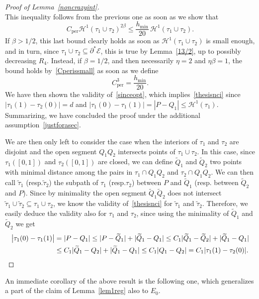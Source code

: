 \documentclass[11pt]{article}
\newcommand{\resp}{resp.\xspace}
\numberwithin{equation}{section}
\newcommand\Ceeb{C_\mathrm{per}}
\newcommand\E{\mathcal{E}}
\renewcommand\H{\mathcal{H}}
\theoremstyle{plain}
\theoremstyle{definition}
\begin{document}
\begin{proof}[Proof of Lemma~\ref{noncrazyint}]
\begin{equation}
\end{equation}
This inequality follows from the previous one as soon as we show that
\[
\Ceeb \H^1(\tau_1 \cup\tau_2)^{2\beta} \leq \frac{h_{\min}}{20}\,\H^1(\tau_1 \cup\tau_2).
\]
If $\beta>1/2$, this last bound clearly holds as soon as $\H^1(\tau_1 \cup\tau_2)$ is small enough, and in turn, since $\tau_1\cup\tau_2\subseteq\partial^*\E$, this is true by Lemma~\ref{13/2}, up to possibly decreasing $R_4$. Instead, if $\beta=1/2$, and then necessarily $\eta=2$ and $\eta\beta=1$, the bound holds by~\eqref{Cperissmall} as soon as we define
\begin{equation}\label{ceeb3}
\Ceeb^3=\frac{h_{\min}}{20}.
\end{equation}
We have then shown the validity of~\eqref{sinceopt}, which implies~\eqref{thesisnci} since $|\tau_1(1)-\tau_2(0)|=d$ and $|\tau_1(0)-\tau_1(1)|=|P-Q_1|\leq \H^1(\tau_1)$. Summarizing, we have concluded the proof under the additional assumption~\eqref{justforasec}.

We are then only left to consider the case when the interiors of $\tau_1$ and $\tau_2$ are disjoint and the open segment $Q_1Q_2$ intersects points of $\tau_1\cup\tau_2$. In this case, since $\tau_1([0,1])$ and $\tau_2([0,1])$ are closed, we can define $\widetilde Q_1$ and $\widetilde Q_2$ two points with minimal distance among the pairs in $\tau_1\cap Q_1Q_2$ and $\tau_2\cap Q_1Q_2$. We can then call $\tilde \tau_1$ (\resp $\tilde\tau_2$) the subpath of $\tau_1$ (\resp $\tau_2$) between $P$ and $\widetilde Q_1$ (\resp between $\widetilde Q_2$ and $P$). Since by minimality the open segment $\widetilde Q_1\widetilde Q_2$ does not intersect $\tilde\tau_1\cup\tilde\tau_2 \subseteq \tau_1\cup\tau_2$, we know the validity of~\eqref{thesisnci} for $\tilde\tau_1$ and $\tilde\tau_2$. Therefore, we easily deduce the validity also for $\tau_1$ and $\tau_2$, since using the minimality of $\widetilde Q_1$ and $\widetilde Q_2$ we get
\begin{align*}
\big|\tau_1(0)-\tau_1(1)\big| &= |P-Q_1|
\leq |P-\widetilde Q_1| + |\widetilde Q_1 - Q_1|
\leq C_1 |\widetilde Q_1 - \widetilde Q_2 | + |\widetilde Q_1 - Q_1|\\
&\leq C_1 |\widetilde Q_1 - Q_2 | + |\widetilde Q_1 - Q_1|
\leq
C_1 |Q_1-Q_2| = C_1 |\tau_1(1)-\tau_2(0)|.\qedhere
\end{align*}
\end{proof}

An immediate corollary of the above result is the following one, which generalizes a part of the claim of Lemma~\ref{lem1reg} also to $E_0$.
\end{document}
